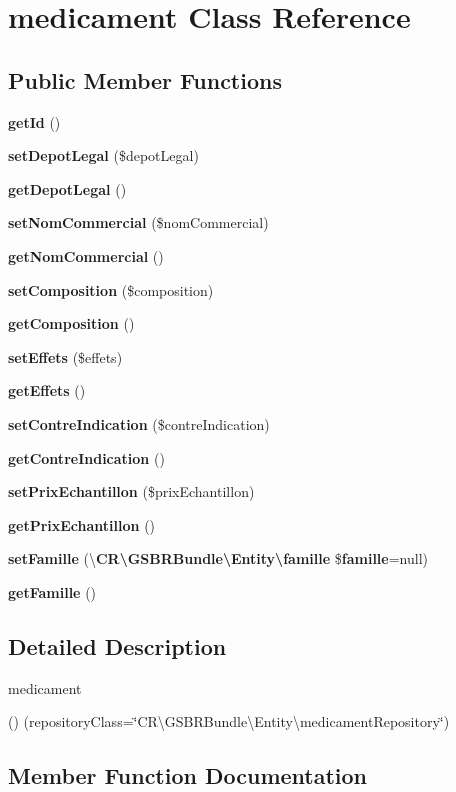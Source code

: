 \section{medicament Class Reference}
\label{class_c_r_1_1_g_s_b_r_bundle_1_1_entity_1_1medicament}
\subsection*{Public Member Functions}
\begin{DoxyCompactItemize}
\item 
{\bf get\+Id} ()
\item 
{\bf set\+Depot\+Legal} (\$depot\+Legal)
\item 
{\bf get\+Depot\+Legal} ()
\item 
{\bf set\+Nom\+Commercial} (\$nom\+Commercial)
\item 
{\bf get\+Nom\+Commercial} ()
\item 
{\bf set\+Composition} (\$composition)
\item 
{\bf get\+Composition} ()
\item 
{\bf set\+Effets} (\$effets)
\item 
{\bf get\+Effets} ()
\item 
{\bf set\+Contre\+Indication} (\$contre\+Indication)
\item 
{\bf get\+Contre\+Indication} ()
\item 
{\bf set\+Prix\+Echantillon} (\$prix\+Echantillon)
\item 
{\bf get\+Prix\+Echantillon} ()
\item 
{\bf set\+Famille} (\textbackslash{}{\bf C\+R\textbackslash{}\+G\+S\+B\+R\+Bundle\textbackslash{}\+Entity\textbackslash{}famille} \${\bf famille}=null)
\item 
{\bf get\+Famille} ()
\end{DoxyCompactItemize}


\subsection{Detailed Description}
medicament

() (repository\+Class=\char`\"{}\+C\+R\textbackslash{}\+G\+S\+B\+R\+Bundle\textbackslash{}\+Entity\textbackslash{}medicament\+Repository\char`\"{}) 

\subsection{Member Function Documentation}
